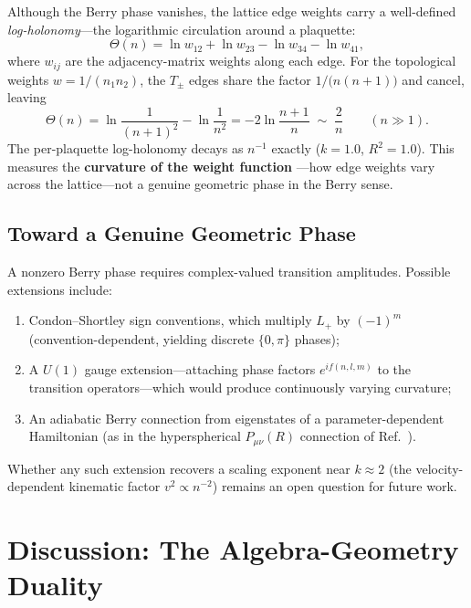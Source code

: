 \documentclass[aps,pra,twocolumn,superscriptaddress,longbibliography]{revtex4-2}
\begin{document}
Although the Berry phase vanishes, the lattice edge weights carry a
well-defined \emph{log-holonomy}---the logarithmic circulation around a
plaquette:
\begin{equation}
\Theta(n) = \ln w_{12} + \ln w_{23} - \ln w_{34} - \ln w_{41},
\label{eq:log_holonomy}
\end{equation}
where $w_{ij}$ are the adjacency-matrix weights along each edge.  For the
topological weights $w = 1/(n_1 n_2)$, the $T_\pm$ edges share the factor
$1/\bigl(n(n+1)\bigr)$ and cancel, leaving
\begin{equation}
\Theta(n) = \ln\!\frac{1}{(n+1)^2} - \ln\!\frac{1}{n^2}
           = -2\ln\!\frac{n+1}{n}
           \;\sim\; \frac{2}{n}
           \qquad (n \gg 1).
\label{eq:log_holonomy_exact}
\end{equation}
The per-plaquette log-holonomy decays as $n^{-1}$ exactly ($k = 1.0$,
$R^2 = 1.0$).  This measures the \textbf{curvature of the weight function}
---how edge weights vary across the lattice---not a genuine geometric phase
in the Berry sense.

\subsection{Toward a Genuine Geometric Phase}

A nonzero Berry phase requires complex-valued transition amplitudes.
Possible extensions include:
\begin{enumerate}
\item Condon--Shortley sign conventions, which multiply $L_+$ by $(-1)^m$
  (convention-dependent, yielding discrete $\{0,\pi\}$ phases);
\item A $U(1)$ gauge extension---attaching phase factors
  $e^{i f(n,l,m)}$ to the transition operators---which would produce
  continuously varying curvature;
\item An adiabatic Berry connection from eigenstates of a
  parameter-dependent Hamiltonian (as in the hyperspherical $P_{\mu\nu}(R)$
  connection of Ref.~\cite{paper13}).
\end{enumerate}
Whether any such extension recovers a scaling exponent near $k \approx 2$
(the velocity-dependent kinematic factor $v^2 \propto n^{-2}$) remains an
open question for future work.


\section{Discussion: The Algebra-Geometry Duality}
\label{sec:discussion}
\end{document}
